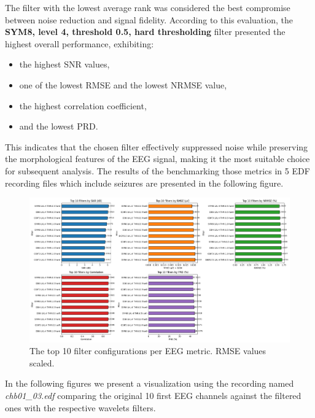 \documentclass{article}
\begin{document}
			The filter with the lowest average rank was considered the best compromise between 
			noise reduction and signal fidelity. According to this 
			evaluation, the \textbf{SYM8, level 4, threshold 0.5, hard thresholding} 
			filter presented the highest overall performance, exhibiting:
			\begin{itemize}
			    \item the highest SNR values,
			    \item one of the lowest RMSE and the lowest NRMSE value,
			    \item the highest correlation coefficient,
			    \item and the lowest PRD.
			\end{itemize}

			This indicates that the chosen filter effectively suppressed noise
			while preserving the morphological features of the EEG signal,
			making it the most suitable choice for subsequent analysis.
			The results of the benchmarking those metrics in 5 EDF 
			recording files which include seizures
			are presented in the following figure.

			\begin{figure}[h]
			    \centering
			    \includegraphics[width=1.1\textwidth]{eeg_metrics_result.png}
			    \caption{The top 10 filter configurations per EEG metric. RMSE values scaled.}
			    \label{}
			\end{figure}

			
			In the following figures we present a visualization using the recording named \textit{chb01\_03.edf}
			comparing the original 10 first EEG channels against the filtered ones with the respective wavelets filters.
\end{document}
